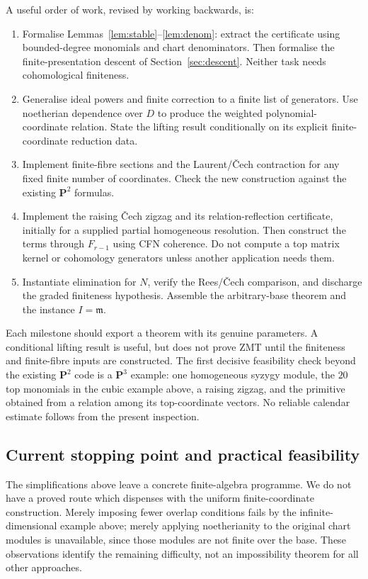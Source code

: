 \documentclass[11pt]{amsart}
\theoremstyle{definition}
\theoremstyle{remark}
\newcommand{\PP}{\mathbf P}
\begin{document}
A useful order of work, revised by working backwards, is:
\begin{enumerate}
\item Formalise Lemmas~\ref{lem:stable}--\ref{lem:denom}: extract
the certificate using bounded-degree monomials and chart
denominators. Then formalise the finite-presentation descent of
Section~\ref{sec:descent}. Neither task needs cohomological finiteness.
\item Generalise ideal powers and finite correction to a finite list
of generators. Use noetherian dependence over $D$ to produce the
weighted polynomial-coordinate relation. State the lifting result
conditionally on its explicit finite-coordinate reduction data.
\item Implement finite-fibre sections and the Laurent/\v Cech
contraction for any fixed finite number of coordinates. Check the
new construction against the existing $\PP^2$ formulas.
\item Implement the raising \v Cech zigzag and its relation-reflection
certificate, initially for a supplied partial homogeneous resolution.
Then construct the terms through $F_{r-1}$ using CFN coherence.
Do not compute a top matrix kernel or cohomology generators unless
another application needs them.
\item Instantiate elimination for $N$, verify the Rees/\v Cech
comparison, and discharge the graded finiteness hypothesis. Assemble
the arbitrary-base theorem and the instance $I=\mathfrak m$.
\end{enumerate}

Each milestone should export a theorem with its genuine parameters.
A conditional lifting result is useful, but does not prove ZMT until
the finiteness and finite-fibre inputs are constructed. The first
decisive feasibility check beyond the existing $\PP^2$ code is a
$\PP^3$ example: one homogeneous syzygy module, the $20$ top
monomials in the cubic example above, a raising zigzag, and the
primitive obtained from a relation among its top-coordinate vectors.
No reliable calendar estimate follows from the present inspection.

\subsection{Current stopping point and practical feasibility}
The simplifications above leave a concrete finite-algebra programme.
We do not have a proved route which dispenses with the uniform
finite-coordinate construction. Merely imposing fewer overlap
conditions fails by the infinite-dimensional example above; merely
applying noetherianity to the original chart modules is unavailable,
since those modules are not finite over the base. These observations
identify the remaining difficulty, not an impossibility theorem for
all other approaches.
\end{document}
